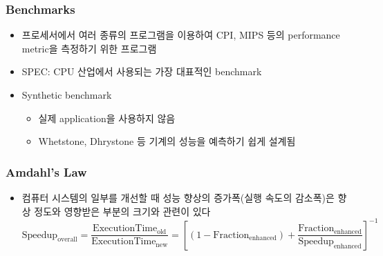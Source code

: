 \subsubsection*{Benchmarks}
\begin{itemize}
    \item 프로세서에서 여러 종류의 프로그램을 이용하여 CPI, MIPS 등의 performance metric을 측정하기 위한 프로그램
    \item SPEC: CPU 산업에서 사용되는 가장 대표적인 benchmark
    \item Synthetic benchmark
    \begin{itemize}
        \item 실제 application을 사용하지 않음
        \item Whetstone, Dhrystone 등 기계의 성능을 예측하기 쉽게 설계됨
    \end{itemize}
\end{itemize}

\subsubsection*{Amdahl's Law}
\begin{itemize}
    \item 컴퓨터 시스템의 일부를 개선할 때 성능 향상의 증가폭(실행 속도의 감소폭)은 향상 정도와 영향받은 부분의 크기와 관련이 있다
    \begin{equation}
        \text{Speedup}_\text{overall}=\frac{\text{ExecutionTime}_\text{old}}{\text{ExecutionTime}_\text{new}}=\left[\left(1-\text{Fraction}_\text{enhanced}\right)+\frac{\text{Fraction}_\text{enhanced}}{\text{Speedup}_\text{enhanced}}\right]^{-1}
    \end{equation}
\end{itemize}
